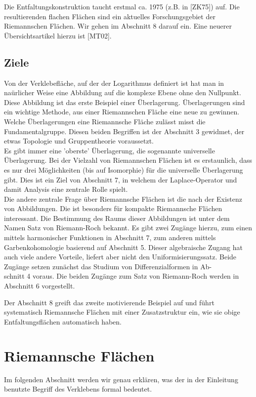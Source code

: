 \documentclass[10pt, letterpaper]{article}
\begin{document}
Die Entfaltungskonstruktion taucht erstmal ca. 1975 (z.B. in [ZK75]) auf. Die resultierenden flachen Flächen sind ein aktuelles Forschungsgebiet der Riemannschen Flächen. Wir gehen im Abschnitt 8 darauf ein. Eine neuerer Übersichtsartikel hierzu ist [MT02].

\subsection {Ziele}
Von der Verklebefläche, auf der der Logarithmus definiert ist hat man in naürlicher Weise eine Abbildung auf die komplexe Ebene ohne den Nullpunkt. Diese Abbildung ist das erste Beispiel einer Überlagerung. Überlagerungen sind ein wichtige Methode, aus einer Riemannschen Fläche eine neue zu gewinnen. Welche Überlagerungen eine Riemannsche Fläche zulässt misst die Fundamentalgruppe. Diesen beiden Begriffen ist der Abschnitt 3 gewidmet, der etwas Topologie und Gruppentheorie voraussetzt.\\
Es gibt immer eine 'oberste' Überlagerung, die sogenannte universelle Überlagerung. Bei der Vielzahl von Riemannschen Flächen ist es erstaunlich, dass es nur drei Möglichkeiten (bis auf Isomorphie) für die universelle Überlagerung gibt. Dies ist ein Ziel von Abschnitt 7, in welchem der Laplace-Operator und damit Analysis eine zentrale Rolle spielt.\\
Die andere zentrale Frage über Riemannsche Flächen ist die nach der Existenz von Abbildungen. Die ist besonders für kompakte Riemannsche Flächen interessant. Die Bestimmung des Raums dieser Abbildungen ist unter dem Namen Satz von Riemann-Roch bekannt. Es gibt zwei Zugänge hierzu, zum einen mittels harmonischer Funktionen in Abschnitt 7, zum anderen mittels Garbenkohomologie basierend auf Abschnitt 5. Dieser algebraische Zugang hat auch viele andere Vorteile, liefert aber nicht den Uniformisierungssatz. Beide Zugänge setzen zunächst das Studium von Differenzialformen in Ab-\\
schnitt 4 voraus. Die beiden Zugänge zum Satz von Riemann-Roch werden in Abschnitt 6 vorgestellt.

Der Abschnitt 8 greift das zweite motivierende Beispiel auf und führt systematisch Riemannsche Flächen mit einer Zusatzstruktur ein, wie sie obige Entfaltungsflächen automatisch haben.


\pagebreak


\section {Riemannsche Flächen}
Im folgenden Abschnitt werden wir genau erklären, was der in der Einleitung benutzte Begriff des Verklebens formal bedeutet.
\end{document}
